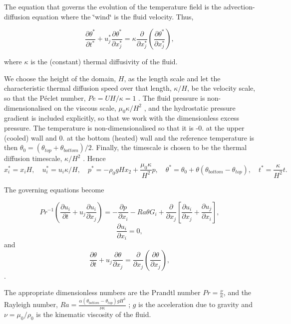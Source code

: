 The equation that governs the evolution of the temperature field is the advection-\/diffusion equation where the \char`\"{}wind\char`\"{} is the fluid velocity. Thus, \begin{center} \[ \frac{\partial \theta^{*}}{\partial t^{*}} + u^{*}_{j}\frac{\partial \theta^{*}}{\partial x^{*}_{j}} = \kappa\frac{\partial}{\partial x^{*}_{j}}\left(\frac{\partial \theta^{*}}{\partial x^{*}_{j}}\right),\] \end{center}  where $ \kappa $ is the (constant) thermal diffusivity of the fluid.

We choose the height of the domain, $ H $, as the length scale and let the characteristic thermal diffusion speed over that length, $ \kappa/H $, be the velocity scale, so that the P\'{e}clet number, $ Pe = UH/\kappa = 1 $ . The fluid pressure is non-\/dimensionalised on the viscous scale, $ \mu_{0} \kappa/H^{2} $ , and the hydrostatic pressure gradient is included explicitly, so that we work with the dimensionless excess pressure. The temperature is non-\/dimensionalised so that it is -\/0. at the upper (cooled) wall and 0. at the bottom (heated) wall and the reference temperature is then $ \theta_{0} = (\theta_{top} + \theta_{bottom})/2 $. Finally, the timescale is chosen to be the thermal diffusion timescale, $ \kappa/H^{2} $ . Hence \[ x^{*}_{i} = x_{i} H, \quad u^{*}_{i} = u_{i} \kappa/H, \quad p^{*} = -\rho_{0} g H x_{2} + \frac{\mu_{0}\kappa}{H^{2}}p,\quad \theta^{*} = \theta_{0} + \theta(\theta_{bottom} - \theta_{top}), \quad t^{*} = \frac{\kappa}{H^{2}}t. \]

The governing equations become \begin{center} \[ Pr^{-1}\left(\frac{\partial u_i}{\partial t} + u_j \frac{\partial u_i}{\partial x_j} \right) = - \frac{\partial p}{\partial x_i} - Ra \theta G_i + \frac{\partial }{\partial x_j} \left[ \frac{\partial u_i}{\partial x_j} + \frac{\partial u_j}{\partial x_i} \right], \] \[ \frac{\partial u_i}{\partial x_i} = 0, \] and \[ \frac{\partial \theta}{\partial t} + u_{j}\frac{\partial \theta}{\partial x_{j}} = \frac{\partial}{\partial x_{j}}\left(\frac{\partial \theta}{\partial x_{j}}\right),\]. \end{center}  The appropriate dimensionless numbers are the Prandtl number $ Pr = \frac{\nu}{\kappa} $, and the Rayleigh number, $ Ra = \frac{\alpha (\theta_{bottom} - \theta_{top})g H^{3}}{\nu\kappa} $ ; $ g $ is the acceleration due to gravity and $ \nu = \mu_{0}/\rho_{0} $ is the kinematic viscosity of the fluid.


